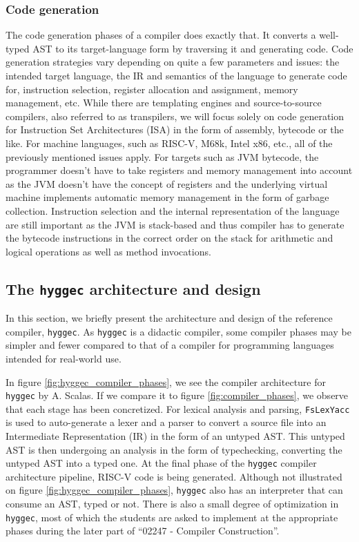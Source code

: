 \subsubsection{Code generation}

The code generation phases of a compiler does exactly that. It converts a well-typed AST to its target-language form by traversing it and generating code.
Code generation strategies vary depending on quite a few parameters and issues: the intended target language, the IR and semantics of the language to generate code for,
instruction selection, register allocation and assignment, memory management, etc. While there are templating engines and source-to-source compilers,
also referred to as transpilers, we will focus solely on code generation for Instruction Set Architectures (ISA) in the form of assembly, bytecode or the like.
For machine languages, such as RISC-V, M68k, Intel x86, etc., all of the previously mentioned issues apply. For targets such as JVM bytecode, the programmer
doesn't have to take registers and memory management into account as the JVM doesn't have the concept of registers and the underlying virtual machine
implements automatic memory management in the form of garbage collection. Instruction selection and the internal representation of the language are still
important as the JVM is stack-based and thus compiler has to generate the bytecode instructions in the correct order on the stack for arithmetic and
logical operations as well as method invocations.

\subsection{The \texttt{hyggec} architecture and design}

In this section, we briefly present the architecture and design of the reference compiler, \texttt{hyggec}. As \texttt{hyggec} is a didactic compiler,
some compiler phases may be simpler and fewer compared to that of a compiler for programming languages intended for real-world use.

In figure \ref{fig:hyggec_compiler_phases}, we see the compiler architecture for \texttt{hyggec} by A. Scalas. If we compare it
to figure \ref{fig:compiler_phases}, we observe that each stage has been concretized. For lexical analysis and parsing, \texttt{FsLexYacc}
is used to auto-generate a lexer and a parser to convert a source file into an Intermediate Representation (IR) in the form of an untyped 
AST. This untyped AST is then undergoing an analysis in the form of typechecking, converting the untyped AST into a typed one. At the
final phase of the \texttt{hyggec} compiler architecture pipeline, RISC-V code is being generated. Although not illustrated on figure
\ref{fig:hyggec_compiler_phases}, \texttt{hyggec} also has an interpreter that can consume an AST, typed or not.
There is also a small degree of optimization in \texttt{hyggec}, most of which the students are asked to implement at the appropriate
phases during the later part of ``02247 - Compiler Construction''\cite{curriculum_02247}.


